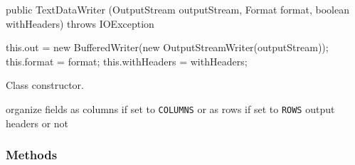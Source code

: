 \begin{code}
   
   public TextDataWriter (OutputStream outputStream, Format format,
                          boolean withHeaders)
         throws IOException \begin{hide} {
      this.out = new BufferedWriter(new OutputStreamWriter(outputStream));
      this.format = format;
      this.withHeaders = withHeaders;
   }
   \end{hide}
\end{code}
\begin{tabb}
Class constructor.
\end{tabb}
\begin{htmlonly}
      {organize fields as columns if set to \texttt{COLUMNS} or as rows if set to \texttt{ROWS}}
 {output headers or not}
\end{htmlonly}


\subsubsection*{Methods}
   
